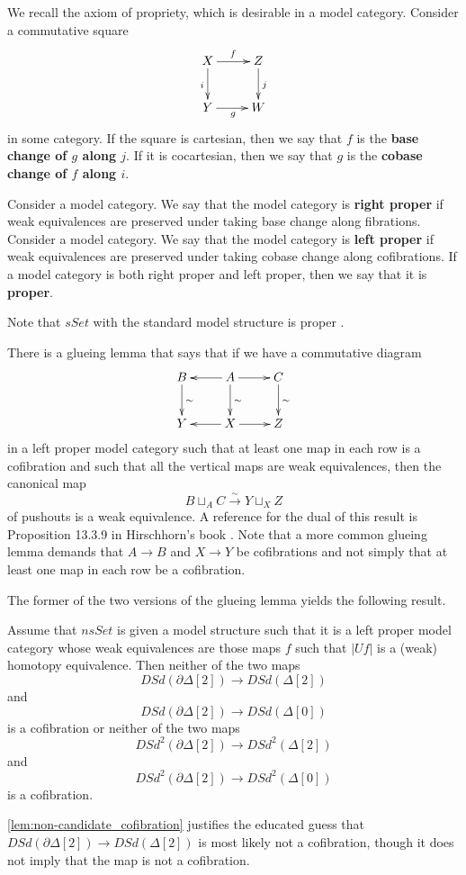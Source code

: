 We recall the axiom of propriety, which is desirable in a model category. Consider a commutative square
\begin{displaymath}
 \xymatrix{
 X \ar[d]_i \ar[r]^f & Z \ar[d]^j \\
 Y \ar[r]_g & W
 }
\end{displaymath}
in some category. If the square is cartesian, then we say that $f$ is the \textbf{base change of $g$ along $j$}. If it is cocartesian, then we say that $g$ is the \textbf{cobase change of $f$ along $i$}.
\begin{definition}
Consider a model category. We say that the model category is \textbf{right proper} if weak equivalences are preserved under taking base change along fibrations. Consider a model category. We say that the model category is \textbf{left proper} if weak equivalences are preserved under taking cobase change along cofibrations. If a model category is both right proper and left proper, then we say that it is \textbf{proper}.
\end{definition}
\noindent Note that $sSet$ with the standard model structure is proper \cite[Thm.~13.1.13, p.~242]{Hi03}.

There is a glueing lemma that says that if we have a commutative diagram
\begin{displaymath}
\xymatrix{
B \ar[d]^\sim & A \ar[l] \ar[d]^\sim \ar[r] & C \ar[d]^\sim \\
Y & X \ar[l] \ar[r] & Z
}
\end{displaymath}
in a left proper model category such that at least one map in each row is a cofibration and such that all the vertical maps are weak equivalences, then the canonical map
\[B\sqcup _AC\xrightarrow{\sim } Y\sqcup _XZ\]
of pushouts is a weak equivalence. A reference for the dual of this result is Proposition 13.3.9 in Hirschhorn's book \cite[pp.~246--247]{Hi03}. Note that a more common glueing lemma demands that $A\to B$ and $X\to Y$ be cofibrations and not simply that at least one map in each row be a cofibration.

The former of the two versions of the glueing lemma yields the following result.
\begin{lemma}\label{lem:non-candidate_cofibration}
Assume that $nsSet$ is given a model structure such that it is a left proper model category whose weak equivalences are those maps $f$ such that $\lvert Uf\rvert$ is a (weak) homotopy equivalence. Then neither of the two maps
\[DSd(\partial \Delta [2])\to DSd(\Delta [2])\]
and
\[DSd(\partial \Delta [2])\to DSd(\Delta [0])\]
is a cofibration or neither of the two maps
\[DSd^2(\partial \Delta [2])\to DSd^2(\Delta [2])\]
and
\[DSd^2(\partial \Delta [2])\to DSd^2(\Delta [0])\]
is a cofibration.
\end{lemma}
\noindent \cref{lem:non-candidate_cofibration} justifies the educated guess that $DSd(\partial \Delta [2])\to DSd(\Delta [2])$ is most likely not a cofibration, though it does not imply that the map is not a cofibration.

